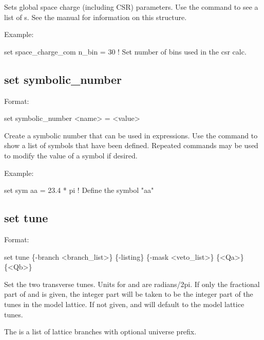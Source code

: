 {{{{{Sets global space charge (including CSR) parameters. Use the 
command to see a list of s. See the \bmad manual for information on this structure.

Example:
\begin{example}
  set space_charge_com n_bin = 30  ! Set number of bins used in the csr calc.
\end{example}


\subsection{set symbolic_number}
\label{s:set.symbolic}

Format:
\begin{example}
  set symbolic_number <name> = <value>
\end{example}

Create a symbolic number that can be used in expressions. Use the  command
to show a list of symbols that have been defined. Repeated  commands may be used to modify
the value of a symbol if desired.

Example:
\begin{example}
  set sym aa = 23.4 * pi  ! Define the symbol "aa"
\end{example}


\subsection{set tune}
\label{s:set.tune}

Format:
\begin{example}
  set tune \{-branch <branch_list>\} \{-listing\} \{-mask <veto_list>\} \{<Qa>\} \{<Qb>\}
\end{example}

Set the two transverse tunes. Units for  and  are radians/2pi. If only the
fractional part of  and  is given, the integer part will be taken to be the
integer part of the tunes in the model lattice. If not given,  and  will
default to the model lattice tunes.

The  is a list of lattice branches with optional universe prefix.

}}}}}
